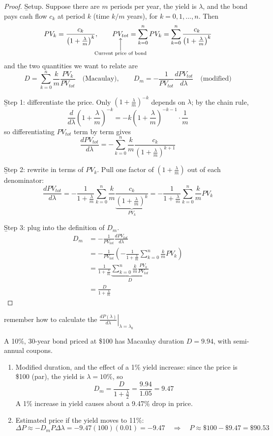 \begin{proof}
    \b{Setup.} Suppose there are $m$ periods per year, the yield is $\lambda$, and the bond pays cash flow $c_k$ at period $k$ (time $k/m$ years), for $k = 0, 1, \dots, n$. Then
    \[PV_k = \frac{c_k}{\left(1+\frac{\lambda}{m}\right)^k}, \qquad \underset{\mathclap{\substack{\Big\uparrow\\\text{Current price of bond}}}}{PV_{tot}} = \sum_{k=0}^{n}PV_k = \sum_{k=0}^{n}\frac{c_k}{\left(1+\frac{\lambda}{m}\right)^k}\]
    and the two quantities we want to relate are
    \[D = \sum_{k=0}^{n}\frac{k}{m}\frac{PV_k}{PV_{tot}} \quad \text{(Macaulay)}, \qquad D_m = -\frac{1}{PV_{tot}}\frac{dPV_{tot}}{d\lambda} \quad \text{(modified)}\]

    \b{Step 1: differentiate the price.} Only $\left(1+\frac{\lambda}{m}\right)^{-k}$ depends on $\lambda$; by the chain rule,
    \[\frac{d}{d\lambda}\left(1+\frac{\lambda}{m}\right)^{-k} = -k\left(1+\frac{\lambda}{m}\right)^{-k-1}\cdot\frac{1}{m}\]
    so differentiating $PV_{tot}$ term by term gives
    \[\frac{dPV_{tot}}{d\lambda} = -\sum_{k=0}^{n}\frac{k}{m}\frac{c_k}{\left(1+\frac{\lambda}{m}\right)^{k+1}}\]

    \b{Step 2: rewrite in terms of $PV_k$.} Pull one factor of $\left(1+\frac{\lambda}{m}\right)$ out of each denominator:
    \[\frac{dPV_{tot}}{d\lambda} = -\frac{1}{1+\frac{\lambda}{m}}\sum_{k=0}^{n}\frac{k}{m}\underbrace{\frac{c_k}{\left(1+\frac{\lambda}{m}\right)^{k}}}_{PV_k} = -\frac{1}{1+\frac{\lambda}{m}}\sum_{k=0}^{n}\frac{k}{m}PV_k\]

    \b{Step 3: plug into the definition of $D_m$.}
    \begin{align*}
        D_m &= -\frac{1}{PV_{tot}}\frac{dPV_{tot}}{d\lambda}\\
        &= -\frac{1}{PV_{tot}}\left(-\frac{1}{1+\frac{\lambda}{m}}\sum_{k=0}^{n}\frac{k}{m}PV_k\right)\\
        &= \frac{1}{1+\frac{\lambda}{m}}\underbrace{\sum_{k=0}^{n}\frac{k}{m}\frac{PV_k}{PV_{tot}}}_{D}\\
        &= \frac{D}{1+\frac{\lambda}{m}}
    \end{align*}
\end{proof}
 remember how to calculate the  $\boxed{\left.\frac{dP(\lambda)}{d\lambda}\right|_{\lambda = \lambda_0}}$

\begin{example}
    A 10\%, 30-year bond priced at \$100 has Macaulay duration $D = 9.94$, with semi-annual coupons.
    \begin{enumerate}[label=(\alph*)]
        \item Modified duration, and the effect of a 1\% yield increase: since the price is \$100 (par), the yield is $\lambda = 10\%$, so
        \[D_m = \frac{D}{1+\frac{\lambda}{2}} = \frac{9.94}{1.05} = 9.47\]
        A 1\% increase in yield causes about a 9.47\% drop in price.
        \item Estimated price if the yield moves to 11\%:
        \[\Delta P \approx -D_m P\Delta\lambda = -9.47(100)(0.01) = -9.47 \quad \Rightarrow \quad P \approx \$100 - \$9.47 = \$90.53\]
    \end{enumerate}
\end{example}

